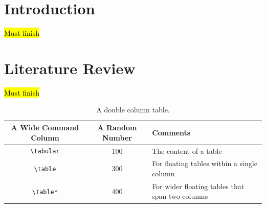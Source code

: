 \documentclass[sigconf, nonacm]{acmart}
\newcommand\vldbavailabilityurl{URL_TO_YOUR_ARTIFACTS}
\begin{document}



\section{Introduction}
\hl{Must finish}

\section{Literature Review}
\hl{Must finish}



\begin{table}[t]
  \caption{A double column table.}
  \label{tab:commands}
  \begin{tabular}{ccl}
    \toprule
    A Wide Command Column & A Random Number & Comments\\
    \midrule
    \verb|\tabular| & 100& The content of a table \\
    \verb|\table|  & 300 & For floating tables within a single column\\
    \verb|\table*| & 400 & For wider floating tables that span two columns\\
    \bottomrule
  \end{tabular}
\end{table}
\end{document}
